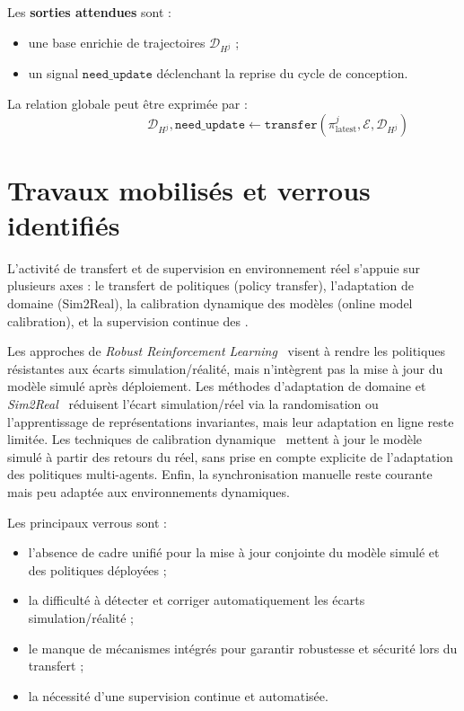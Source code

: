Les \textbf{sorties attendues} sont :
\begin{itemize}
  \item une base enrichie de trajectoires $\mathcal{D}_{H^j}$ ;
  \item un signal $\texttt{need\_update}$ déclenchant la reprise du cycle de conception.
\end{itemize}

La relation globale peut être exprimée par :
\[
  \hspace{3cm}\mathcal{D}_{H^j}, \texttt{need\_update} \gets \texttt{transfer}(\pi^j_{\text{latest}}, \mathcal{E}, \mathcal{D}_{H^j})
\]

\section{Travaux mobilisés et verrous identifiés}

L'activité de transfert et de supervision en environnement réel s'appuie sur plusieurs axes : le transfert de politiques (policy transfer), l'adaptation de domaine (Sim2Real), la calibration dynamique des modèles (online model calibration), et la supervision continue des .

Les approches de \textit{Robust Reinforcement Learning}~\cite{pinto2017robust} visent à rendre les politiques résistantes aux écarts simulation/réalité, mais n'intègrent pas la mise à jour du modèle simulé après déploiement. Les méthodes d'adaptation de domaine et \textit{Sim2Real}~\cite{tobin2017domain,ganin2016domain} réduisent l'écart simulation/réel via la randomisation ou l'apprentissage de représentations invariantes, mais leur adaptation en ligne reste limitée. Les techniques de calibration dynamique~\cite{deisenroth2011pilco} mettent à jour le modèle simulé à partir des retours du réel, sans prise en compte explicite de l'adaptation des politiques multi-agents. Enfin, la synchronisation manuelle reste courante mais peu adaptée aux environnements dynamiques.

Les principaux verrous sont :
\begin{itemize}
  \item l'absence de cadre unifié pour la mise à jour conjointe du modèle simulé et des politiques déployées ;
  \item la difficulté à détecter et corriger automatiquement les écarts simulation/réalité ;
  \item le manque de mécanismes intégrés pour garantir robustesse et sécurité lors du transfert ;
  \item la nécessité d'une supervision continue et automatisée.
\end{itemize}


